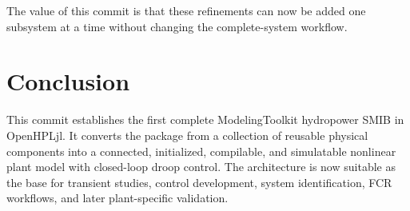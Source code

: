 \documentclass[11pt,a4paper]{article}
\begin{document}
The value of this commit is that these refinements can now be added one subsystem at a time without changing the complete-system workflow.

\section{Conclusion}
This commit establishes the first complete ModelingToolkit hydropower SMIB in OpenHPLjl. It converts the package from a collection of reusable physical components into a connected, initialized, compilable, and simulatable nonlinear plant model with closed-loop droop control. The architecture is now suitable as the base for transient studies, control development, system identification, FCR workflows, and later plant-specific validation.
\end{document}
